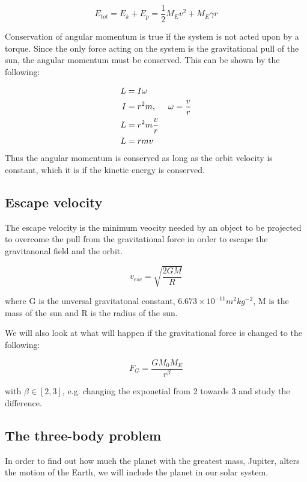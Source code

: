 \documentclass[../main.tex]{subfiles}
\begin{document}
$$E_{tot} = E_k + E_p = \frac{1}{2} M_E v^2 + M_E \gamma r$$

Conservation of angular momentum is true if the system is not acted upon by a torque. Since the only force acting on the system is the gravitational pull of the sun, the angular momentum must be conserved. This can be shown by the following:

\begin{align*}
  L &= I \omega \\
  I &= r^2m, \hspace{5mm} \omega = \frac{v}{r} \\
  L &= r^2m \frac{v}{r} \\
  L &= rmv
\end{align*}
Thus the angular momentum is conserved as long as the orbit velocity is constant, which it is if the kinetic energy is conserved.

\subsection{Escape velocity}\label{sec:theory-EscapeVelocity}
The escape velocity is the minimum veocity needed by an object to be projected to overcome the pull from the gravitational force in order to escape the gravitanonal field and the orbit.

\begin{equation}\label{eq:escapevelocity}
  v_{esc} = \sqrt{\frac{2GM}{R}}
\end{equation}

where G is the unversal gravitatonal constant, $6.673\times 10^{-11} m^2kg^{-2}$, M is the mass of the sun and R is the radius of the sun.

We will also look at what will happen if the gravitational force is changed to the following:

$$F_G = \frac{GM_0M_E}{r^{\beta}}$$

with $\beta \in [2,3]$, e.g. changing the exponetial from 2 towards 3 and study the difference.

\subsection{The three-body problem}
In order to find out how much the planet with the greatest mass, Jupiter, alters the motion of the Earth, we will include the planet in our solar system.
\end{document}

